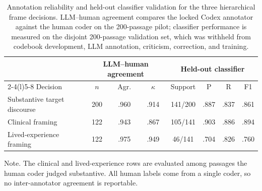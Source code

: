 \begin{table}[t!]
\caption{Annotation reliability and held-out classifier validation for the three
hierarchical frame decisions. LLM--human agreement compares the locked Codex annotator
against the human coder on the 200-passage pilot; classifier performance is measured on
the disjoint 200-passage validation set, which was withheld from codebook development,
LLM annotation, criticism, correction, and training.}
\label{tab:annotation}
\small
\begin{tabular}{@{}lccccccc@{}}
\toprule
& \multicolumn{3}{c}{LLM--human agreement} & \multicolumn{4}{c}{Held-out classifier} \\
\cmidrule(r){2-4}\cmidrule(l){5-8}
Decision & $n$ & Agr. & $\kappa$ & Support & P & R & F1 \\
\midrule
Substantive target discourse & 200 & .960 & .914 & 141/200 & .887 & .837 & .861 \\
Clinical framing & 122 & .943 & .867 & 105/141 & .903 & .886 & .894 \\
Lived-experience framing & 122 & .975 & .949 & 46/141 & .704 & .826 & .760 \\
\bottomrule
\end{tabular}
\par\vspace{3pt}
\parbox{\linewidth}{\footnotesize Note. The clinical and lived-experience rows are
evaluated among passages the human coder judged substantive. All human labels come from a
single coder, so no inter-annotator agreement is reportable.}
\end{table}

